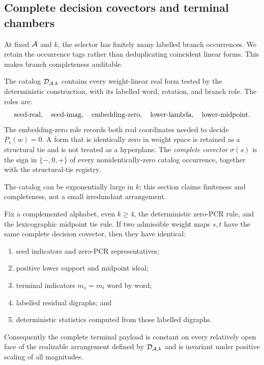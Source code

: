 \subsection{Complete decision covectors and terminal chambers}
\label{sec:covectors}

At fixed $\mathcal A$ and $k$, the selector has finitely many labelled branch
occurrences.  We retain the occurrence tags rather than deduplicating
coincident linear forms.  This makes branch completeness auditable.

\begin{definition}
\label{def:decision-catalog}
The catalog $\mathcal D_{\mathcal A,k}$ contains every weight-linear real form tested
by the deterministic construction, with its labelled word, rotation, and
branch role.  The roles are:
\[
  \role{seed-real},\quad \role{seed-imag},\quad
  \role{embedding-zero},\quad \role{lower-lambda},\quad
  \role{lower-midpoint}.
\]
The embedding-zero role records both real coordinates needed to decide
$P_s(w)=0$.  A form that is identically zero in weight space is retained as a
structural tie and is not treated as a hyperplane.  The \emph{complete
covector} $\sigma(s)$ is the sign in $\{-,0,+\}$ of every nonidentically-zero
catalog occurrence, together with the structural-tie registry.
\end{definition}

The catalog can be exponentially large in $k$; this section claims
finiteness and completeness, not a small irredundant arrangement.

\begin{theorem}
\label{thm:terminal-covector}
Fix a complemented alphabet, even $k\ge4$, the deterministic zero-PCR rule,
and the lexicographic midpoint tie rule.  If two admissible weight maps $s,t$
have the same complete decision covector, then they have identical:
\begin{enumerate}
  \item seed indicators and zero-PCR representatives;
  \item positive lower support and midpoint ideal;
  \item terminal indicators $m_s=m_t$ word by word;
  \item labelled residual digraphs; and
  \item deterministic statistics computed from those labelled digraphs.
\end{enumerate}
Consequently the complete terminal payload is constant on every relatively
open face of the realizable arrangement defined by $\mathcal D_{\mathcal A,k}$ and is
invariant under positive scaling of all magnitudes.
\end{theorem}


